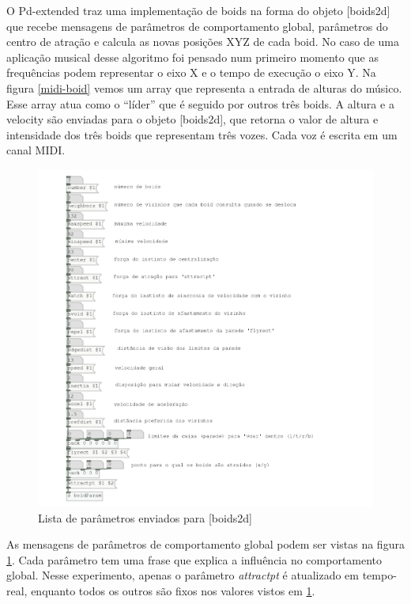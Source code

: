 \documentclass{ppgmus}
\begin{document}
O Pd-extended traz uma implementação de boids na forma do objeto [boids2d] que recebe mensagens de parâmetros
de comportamento global, parâmetros do centro de atração e calcula as novas posições XYZ de cada
boid. No caso de uma aplicação musical desse algoritmo foi pensado num primeiro momento que as frequências
podem representar o eixo X e o tempo de execução o eixo Y. 
Na figura \ref{midi-boid} vemos um array que representa a entrada de alturas do músico. Esse array atua como
o ``líder'' que é seguido por outros três boids. A altura e a velocity são enviadas para o objeto [boids2d],
que retorna o valor de altura e intensidade dos três boids que representam três vozes. Cada voz é escrita
em um canal MIDI.


\begin{figure}
\includegraphics[scale=.6]{boids-param}
\caption{Lista de parâmetros enviados para [boids2d]}
\label{boids-param}
\end{figure} 

As mensagens de parâmetros de comportamento global podem ser vistas na figura \ref{boids-param}. 
Cada parâmetro tem uma frase que explica a influência no comportamento global. Nesse experimento,
apenas o parâmetro \textit{attractpt} é atualizado em tempo-real, enquanto todos os outros são
fixos nos valores vistos em \ref{boids-param}.
\end{document}
